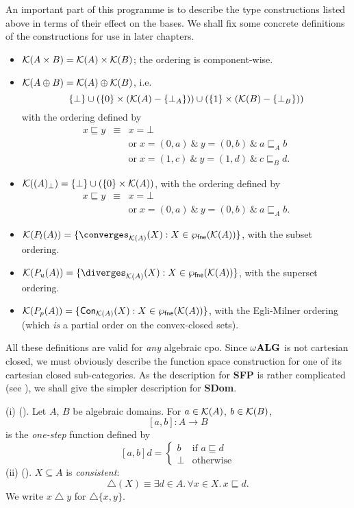 An important part of this programme is to describe the type constructions listed above in terms of their effect on the bases.
We shall fix some concrete definitions of the constructions for use in later chapters.
\begin{itemize}
\item ${\cal K}(A \times B) = {\cal K}(A) \times {\cal K}(B)$; the ordering is component-wise.
\item ${\cal K}(A \oplus B) = {\cal K}(A) \oplus {\cal K}(B)$, i.e.
\[ \{ \bot \} \cup (\{ 0 \} \times ({\cal K}(A) - \{ \bot_{A} \} )) \cup (\{ 1 \} \times ({\cal K}(B) - \{ \bot_{B} \} )) \]
with the ordering defined by
\begin{eqnarray*}
x \sqsubseteq y & \equiv & x = \bot \\
& & \mbox{or} \; x = (0, a) \: \& \: y = (0, b) \: \& \: a \sqsubseteq_{A} b \\
& & \mbox{or} \; x = (1, c) \: \& \: y = (1, d) \: \& \: c \sqsubseteq_{B} d .
\end{eqnarray*}
\item ${\cal K}((A)_{\bot}) = \{ \bot \} \cup ( \{ 0 \} \times {\cal K}(A))$, with the ordering defined by
\begin{eqnarray*}
x \sqsubseteq y & \equiv & x = \bot \\
& & \mbox{or} \; x = (0, a) \: \& \: y = (0, b) \: \& \: a \sqsubseteq_{A} b.
\end{eqnarray*}
\item ${\cal K}(P_{l}(A)) = \{ \converges_{{\cal K}(A)}(X) : X \in \wp_{\sf fne}({\cal K}(A)) \}$, with the subset ordering.
\item ${\cal K}(P_{u}(A)) = \{ \diverges_{{\cal K}(A)}(X) : X \in \wp_{\sf fne}({\cal K}(A)) \}$, with the superset ordering.
\item ${\cal K}(P_{p}(A)) = \{ {\sf Con}_{{\cal K}(A)}(X) : X \in \wp_{\sf fne}({\cal K}(A)) \}$, with the Egli-Milner ordering (which {\em is} a partial order on the convex-closed sets).
\end{itemize}
All these definitions are valid for {\em any} algebraic cpo.
Since $\omega {\bf ALG}$ is not cartesian closed, we must obviously describe the function space construction for one of its cartesian closed sub-categories.
As the description for {\bf SFP} is rather complicated (see \cite{Gun85}),  we shall give the simpler description for {\bf SDom}.
\begin{definition}
{\rm (i) (\cite[Chapter 6 p.\  1]{PloLN}). Let $A$, $B$ be algebraic domains. For $a \in {\cal K}(A)$, $b \in {\cal K}(B)$,
\[ [a, b] : A \rightarrow B \]
is the {\em one-step} function defined by
\[ [a, b] d = \left\{ \begin{array}{ll}
b & \mbox{if $a \sqsubseteq d$} \\
\bot & \mbox{otherwise}
\end{array} \right. \]
(ii) (\cite[Chapter 6 p.\  13]{PloLN}). $X \subseteq A$ is {\em consistent}:
\[ \bigtriangleup (X) \equiv \exists d \in A. \, \forall x \in X. \, x \sqsubseteq d. \]
We write $x \bigtriangleup y$ for $\bigtriangleup \{ x, y \}$.}
\end{definition}
